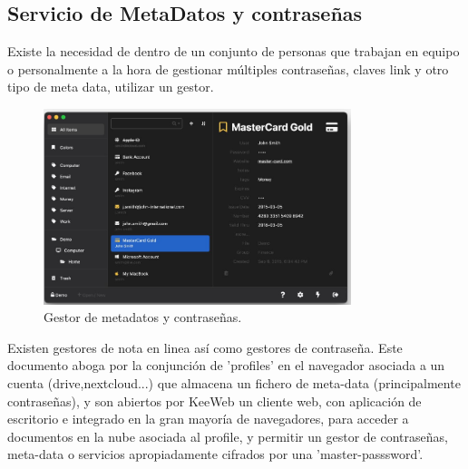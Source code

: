 \subsection{Servicio de MetaDatos y contraseñas}
Existe la necesidad de dentro de un conjunto de personas que trabajan en equipo o personalmente a la hora de gestionar múltiples contraseñas, claves link y otro tipo de meta data, utilizar un gestor.
\begin{figure}[!htb]
\begin{center}
\includegraphics[width=0.8\textwidth]{./figuras/keeweb.jpg}
\caption{Gestor de metadatos y contraseñas.}
\label{F:keeweb}
\end{center}
\end{figure}
Existen gestores de nota en linea así como gestores de contraseña. Este documento aboga por la conjunción de 'profiles' en el navegador asociada a un cuenta (drive,nextcloud...) que almacena un fichero de meta-data (principalmente contraseñas), y son abiertos por KeeWeb\cite{c_keeweb} un cliente web, con aplicación de escritorio e integrado en la gran mayoría de navegadores, para acceder a documentos en la nube asociada al profile, y permitir un gestor de contraseñas, meta-data o servicios apropiadamente cifrados por una 'master-passsword'.

